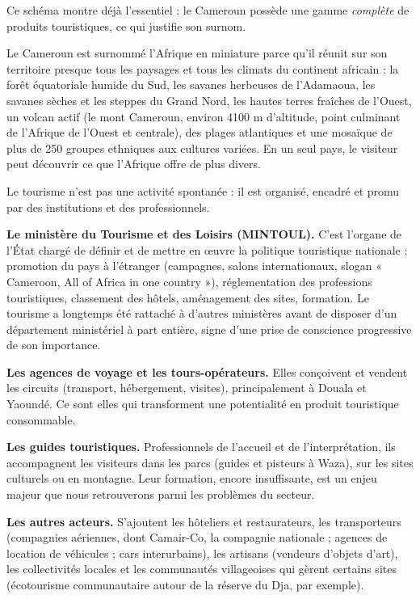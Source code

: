 \documentclass[11pt]{article}
\newcommand{\cle}[1]{{\popxbold\color{popdark}#1}}
\newcounter{popsec}
\newcounter{popsub}
\newcommand{\courssub}[1]{%
  \stepcounter{popsub}%
  \par\vspace{9pt}\noindent{\popxbold\fontsize{11.5}{13}\selectfont\color{popink}{\color{poporange}\thepopsec.\thepopsub}\hspace{6pt}#1}\par\nopagebreak\vspace{4pt}
}
\begin{document}
Ce schéma montre déjà l'essentiel : le Cameroun possède une gamme \emph{complète} de produits touristiques, ce qui justifie son surnom.

\begin{savaistu}
Le Cameroun est surnommé \cle{l'Afrique en miniature} parce qu'il réunit sur son territoire presque tous les paysages et tous les climats du continent africain : la forêt équatoriale humide du Sud, les savanes herbeuses de l'Adamaoua, les savanes sèches et les steppes du Grand Nord, les hautes terres fraîches de l'Ouest, un volcan actif (le mont Cameroun, environ \num{4100} m d'altitude, point culminant de l'Afrique de l'Ouest et centrale), des plages atlantiques et une mosaïque de plus de 250 groupes ethniques aux cultures variées. En un seul pays, le visiteur peut découvrir ce que l'Afrique offre de plus divers.
\end{savaistu}

\courssub{Le cadre institutionnel du tourisme au Cameroun}

Le tourisme n'est pas une activité spontanée : il est organisé, encadré et promu par des institutions et des professionnels.

\textbf{Le ministère du Tourisme et des Loisirs (MINTOUL).} C'est l'organe de l'État chargé de définir et de mettre en œuvre la politique touristique nationale : promotion du pays à l'étranger (campagnes, salons internationaux, slogan « Cameroon, All of Africa in one country »), réglementation des professions touristiques, classement des hôtels, aménagement des sites, formation. Le tourisme a longtemps été rattaché à d'autres ministères avant de disposer d'un département ministériel à part entière, signe d'une prise de conscience progressive de son importance.

\textbf{Les agences de voyage et les tours-opérateurs.} Elles conçoivent et vendent les circuits (transport, hébergement, visites), principalement à Douala et Yaoundé. Ce sont elles qui transforment une potentialité en produit touristique consommable.

\textbf{Les guides touristiques.} Professionnels de l'accueil et de l'interprétation, ils accompagnent les visiteurs dans les parcs (guides et pisteurs à Waza), sur les sites culturels ou en montagne. Leur formation, encore insuffisante, est un enjeu majeur que nous retrouverons parmi les problèmes du secteur.

\textbf{Les autres acteurs.} S'ajoutent les hôteliers et restaurateurs, les transporteurs (compagnies aériennes, dont Camair-Co, la compagnie nationale ; agences de location de véhicules ; cars interurbains), les artisans (vendeurs d'objets d'art), les collectivités locales et les communautés villageoises qui gèrent certains sites (écotourisme communautaire autour de la réserve du Dja, par exemple).
\end{document}
